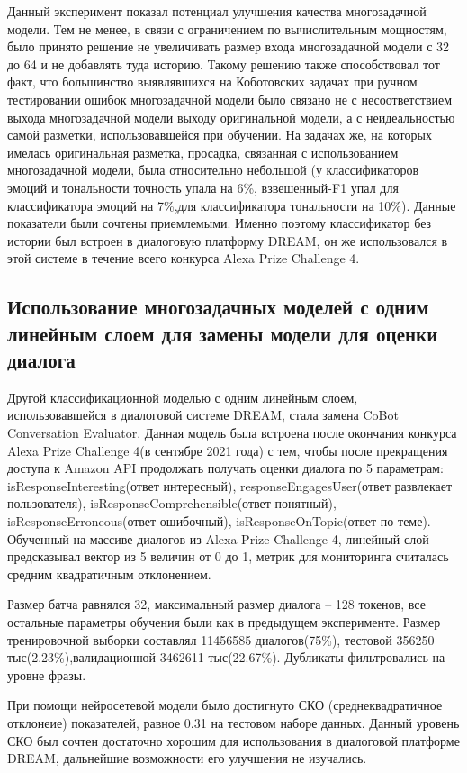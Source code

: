 Данный эксперимент показал потенциал улучшения качества многозадачной модели. Тем не менее, в связи с ограничением по вычислительным мощностям, было принято решение не увеличивать размер входа многозадачной модели с 32 до 64 и не добавлять туда историю. Такому решению также способствовал тот факт, что большинство выявлявшихся на Коботовских задачах при ручном тестировании ошибок многозадачной модели было связано не с несоответствием выхода многозадачной модели выходу оригинальной модели, а с неидеальностью самой разметки, использовавшейся при обучении. 
На задачах же, на которых имелась оригинальная разметка, просадка, связанная с использованием многозадачной модели, была относительно небольшой (у классификаторов эмоций и тональности точность упала на 6\%, взвешенный-F1 упал для классификатора эмоций на 7\%,для классификатора тональности на 10\%). Данные показатели были сочтены приемлемыми. Именно поэтому классификатор без истории был встроен в диалоговую платформу DREAM, он же использовался в этой системе в течение всего конкурса Alexa Prize Challenge 4.

\subsection{Использование многозадачных моделей с одним линейным слоем для замены модели для оценки диалога}
Другой классификационной моделью с одним линейным слоем, использовавшейся в диалоговой системе DREAM, стала замена CoBot Conversation Evaluator. Данная модель была встроена после окончания конкурса Alexa Prize Challenge 4(в сентябре 2021 года) с тем, чтобы после прекращения доступа к Amazon API продолжать получать оценки диалога по 5 параметрам: isResponseInteresting(ответ интересный), responseEngagesUser(ответ развлекает пользователя), isResponseComprehensible(ответ понятный), isResponseErroneous(ответ ошибочный), isResponseOnTopic(ответ по теме). Обученный на массиве диалогов из Alexa Prize Challenge 4, линейный слой предсказывал вектор из 5 величин от 0 до 1, метрик для мониторинга считалась средним квадратичным отклонением. 

Размер батча равнялся 32, максимальный размер диалога -- 128 токенов, все остальные параметры обучения были как в предыдущем эксперименте. Размер тренировочной выборки составлял 11456585 диалогов(75\%), тестовой 356250 тыс(2.23\%),валидационной 3462611 тыс(22.67\%). Дубликаты фильтровались на уровне фразы.

При помощи нейросетевой модели было достигнуто СКО (среднеквадратичное отклонеие) показателей, равное 0.31 на тестовом наборе данных. Данный уровень СКО был сочтен достаточно хорошим для использования в диалоговой платформе DREAM, дальнейшие возможности его улучшения не изучались.


